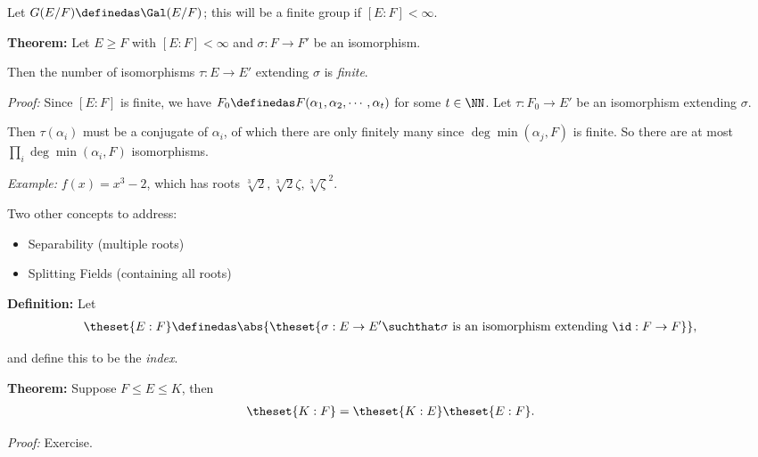 \begin{center}
\end{center}

Let \(G(E/F) \definedas \Gal(E/F)\); this will be a finite group if
\([E: F] < \infty\).

\textbf{Theorem:} Let \(E \geq F\) with \([E: F] < \infty\) and
\(\sigma: F \to F'\) be an isomorphism.

Then the number of isomorphisms \(\tau: E \to E'\) extending \(\sigma\)
is \emph{finite}.

\emph{Proof:} Since \([E: F]\) is finite, we have
\(F_0 \definedas F(\alpha_1, \alpha_2, \cdots, \alpha_t)\) for some
\(t\in \NN\). Let \(\tau: F_0 \to E'\) be an isomorphism extending
\(\sigma\).

Then \(\tau(\alpha_i)\) must be a conjugate of \(\alpha_i\), of which
there are only finitely many since \(\deg \min(\alpha_j, F)\) is finite.
So there are at most \(\prod_i \deg\min(\alpha_i, F)\) isomorphisms.

\emph{Example:} \(f(x) = x^3 - 2\), which has roots
\(\sqrt[3] 2, \sqrt[3] 2 \zeta, \sqrt[3] \zeta^2\).

Two other concepts to address:

\begin{itemize}
\item
  Separability (multiple roots)
\item
  Splitting Fields (containing all roots)
\end{itemize}

\textbf{Definition:} Let
\begin{align*}
\theset{E: F} \definedas
\abs{ \theset{\sigma: E \to E' \suchthat \sigma \text{ is an isomorphism extending } \id: F \to F}}
,\end{align*}

and define this to be the \emph{index}.

\textbf{Theorem:} Suppose \(F \leq E \leq K\), then
\begin{align*}
\theset{K: F} = \theset{K: E} \theset{E: F}.
\end{align*}

\emph{Proof:} Exercise.

